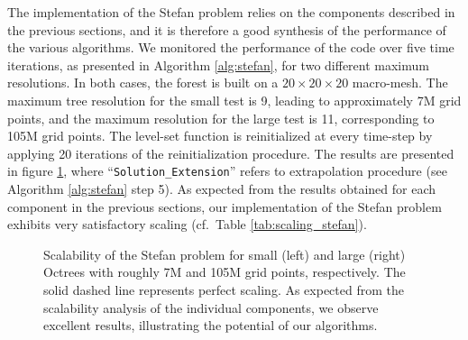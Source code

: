 The implementation of the Stefan problem relies on the components described in the previous sections, and it is therefore a good synthesis of the performance of the various algorithms. We monitored the performance of the code over five time iterations, as presented in Algorithm \ref{alg:stefan}, for two different maximum resolutions. In both cases, the forest is built on a $20\times20\times20$ macro-mesh. The maximum tree resolution for the small test is 9, leading to approximately 7M grid points, and the maximum resolution for the large test is 11, corresponding to 105M grid points. The level-set function is reinitialized at every time-step by applying 20 iterations of the reinitialization procedure. The results are presented in figure \ref{fig:stefan_scaling}, where ``\verb|Solution_Extension|'' refers to extrapolation procedure (see Algorithm \ref{alg:stefan} step 5). As expected from the results obtained for each component in the previous sections, our implementation of the Stefan problem exhibits very satisfactory scaling (cf.\ Table \ref{tab:scaling_stefan}).

\begin{figure}
\centering
{}
\caption{Scalability of the Stefan problem for small (left) and large (right) Octrees with roughly 7M and 105M grid points, respectively. The solid dashed line represents perfect scaling. As expected from the scalability analysis of the individual components, we observe excellent results, illustrating the potential of our algorithms.}
\label{fig:stefan_scaling}
\end{figure}

